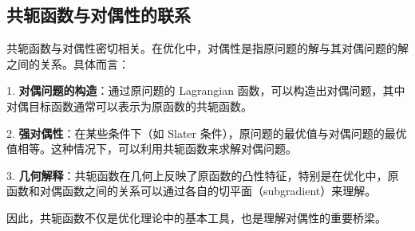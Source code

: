 \documentclass[a4paper]{article}
\begin{document}
\subsection{共轭函数与对偶性的联系}

共轭函数与对偶性密切相关。在优化中，对偶性是指原问题的解与其对偶问题的解之间的关系。具体而言：

1. \textbf{对偶问题的构造}：通过原问题的 Lagrangian 函数，可以构造出对偶问题，其中对偶目标函数通常可以表示为原函数的共轭函数。

2. \textbf{强对偶性}：在某些条件下（如 Slater 条件），原问题的最优值与对偶问题的最优值相等。这种情况下，可以利用共轭函数来求解对偶问题。

3. \textbf{几何解释}：共轭函数在几何上反映了原函数的凸性特征，特别是在优化中，原函数和对偶函数之间的关系可以通过各自的切平面（subgradient）来理解。

因此，共轭函数不仅是优化理论中的基本工具，也是理解对偶性的重要桥梁。
\end{document}
